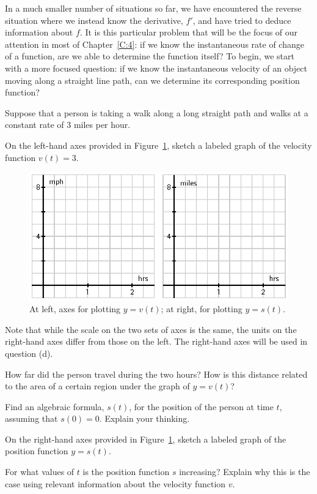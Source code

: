 In a much smaller number of situations so far, we have encountered the reverse situation where we instead know the derivative, $f'$, and have tried to deduce information about $f$.  It is this particular problem that will be the focus of our attention in most of Chapter~\ref{C:4}: if we know the instantaneous rate of change of a function, are we able to determine the function itself?  To begin, we start with a more focused question:  if we know the instantaneous velocity of an object moving along a straight line path, can we determine its corresponding position function? 

\begin{pa} \label{PA:4.1}
Suppose that a person is taking a walk along a long straight path and walks at a constant rate of 3 miles per hour.
\ba
	\item On the left-hand axes provided in Figure~\ref{F:4.1.PA1}, sketch a labeled graph of the velocity function $v(t) = 3$.  
\begin{figure}[h]
\begin{center}
\includegraphics{figures/4_1_PA1.eps}
\caption{At left, axes for plotting $y = v(t)$; at right, for plotting $y = s(t)$.} \label{F:4.1.PA1}
\end{center}
\end{figure}
Note that while the scale on the two sets of axes is the same, the units on the right-hand axes differ from those on the left.  The right-hand axes will be used in question (d).
	\item How far did the person travel during the two hours?  How is this distance related to the area of a certain region under the graph of $y = v(t)$?
	\item Find an algebraic formula, $s(t)$, for the position of the person at time $t$, assuming that $s(0) = 0$.  Explain your thinking.
	\item On the right-hand axes provided in Figure~\ref{F:4.1.PA1}, sketch a labeled graph of the position function $y = s(t)$.
	\item For what values of $t$ is the position function $s$ increasing?  Explain why this is the case using relevant information about the velocity function $v$.
\ea
\end{pa} 
\afterpa

